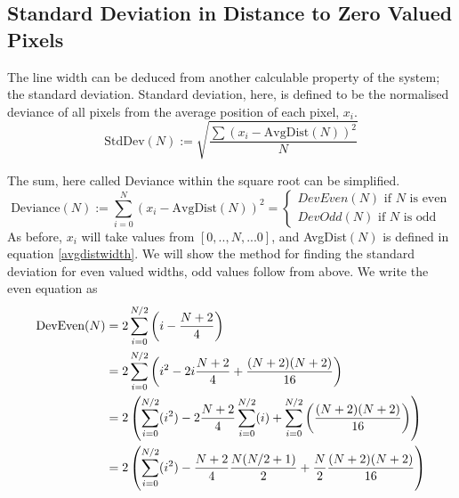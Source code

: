 \documentclass[../main.tex]{subfiles}
\begin{document}
  \subsection{Standard Deviation in Distance to Zero Valued Pixels}
    The line width can be deduced from another calculable property of the system; the standard deviation.
    Standard deviation, here, is defined to be the normalised deviance of all pixels from the average position of each pixel, $x_i$.
    \[\text{StdDev}(N) := \sqrt{\frac{\sum \left(x_i-\text{AvgDist}(N)\right)^2}{N}}\]
    
    The sum, here called Deviance within the square root can be simplified.
    \[\text{Deviance}(N) := \sum_{i=0}^N\left(x_i-\text{AvgDist}(N)\right)^2 =
      \begin{cases}
        DevEven(N) \text{ if } N \text{ is even}\\
        DevOdd(N) \text{ if } N \text{ is odd}
      \end{cases}
    \]
    As before, $x_i$ will take values from $[0,..,N,...0]$, and AvgDist$(N)$ is defined in equation \ref{avgdistwidth}.
    We will show the method for finding the standard deviation for even valued widths, odd values follow from above.
    We write the even equation as
    \begin{align}
      \text{DevEven}(N) &= 2\sum_{i=0}^{N/2}\left(i-\frac{N+2}{4}\right)\notag\\
        &=2\sum_{i=0}^{N/2}\left(i^2-2i\frac{N+2}{4}+\frac{(N+2)(N+2)}{16}\right)\notag\\
        &=2\left(\sum_{i=0}^{N/2}(i^2)-2\frac{N+2}{4}\sum_{i=0}^{N/2}(i) + \sum_{i=0}^{N/2}\left(\frac{(N+2)(N+2)}{16}\right)\right)\notag\\
        &=2\left(\sum_{i=0}^{N/2}(i^2)-\frac{N+2}{4}\frac{N(N/2+1)}{2} + \frac{N}{2}\frac{(N+2)(N+2)}{16}\right)
      \label{devianceunfin}
    \end{align}
    
\end{document}
